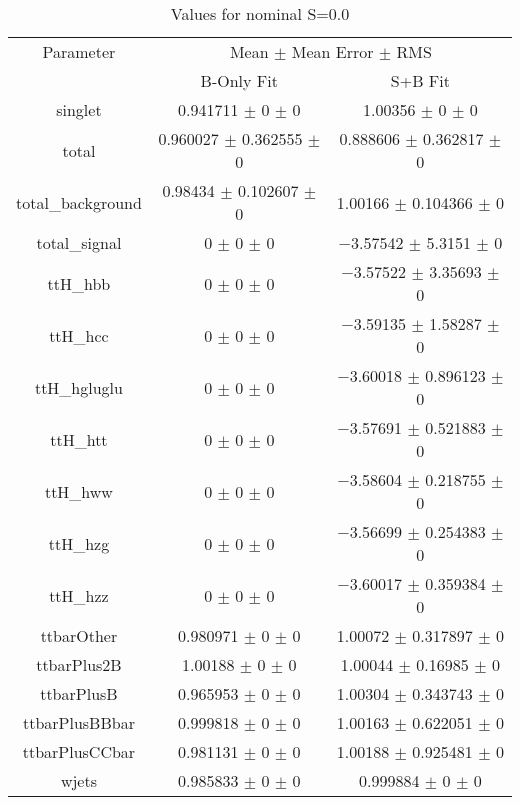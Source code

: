 \begin{table}
\centering
\caption{Values for nominal S=0.0}
\begin{tabular}{ccc}
\toprule
Parameter & \multicolumn{2}{c}{Mean $\pm$ Mean Error $\pm$ RMS}\\
 & B-Only Fit & S+B Fit\\
\midrule
singlet & \num{0.941711} $\pm$ \num{0} $\pm$ \num{0} & \num{1.00356} $\pm$ \num{0} $\pm$ \num{0}\\
total & \num{0.960027} $\pm$ \num{0.362555} $\pm$ \num{0} & \num{0.888606} $\pm$ \num{0.362817} $\pm$ \num{0}\\
total\_background & \num{0.98434} $\pm$ \num{0.102607} $\pm$ \num{0} & \num{1.00166} $\pm$ \num{0.104366} $\pm$ \num{0}\\
total\_signal & \num{0} $\pm$ \num{0} $\pm$ \num{0} & \num{-3.57542} $\pm$ \num{5.3151} $\pm$ \num{0}\\
ttH\_hbb & \num{0} $\pm$ \num{0} $\pm$ \num{0} & \num{-3.57522} $\pm$ \num{3.35693} $\pm$ \num{0}\\
ttH\_hcc & \num{0} $\pm$ \num{0} $\pm$ \num{0} & \num{-3.59135} $\pm$ \num{1.58287} $\pm$ \num{0}\\
ttH\_hgluglu & \num{0} $\pm$ \num{0} $\pm$ \num{0} & \num{-3.60018} $\pm$ \num{0.896123} $\pm$ \num{0}\\
ttH\_htt & \num{0} $\pm$ \num{0} $\pm$ \num{0} & \num{-3.57691} $\pm$ \num{0.521883} $\pm$ \num{0}\\
ttH\_hww & \num{0} $\pm$ \num{0} $\pm$ \num{0} & \num{-3.58604} $\pm$ \num{0.218755} $\pm$ \num{0}\\
ttH\_hzg & \num{0} $\pm$ \num{0} $\pm$ \num{0} & \num{-3.56699} $\pm$ \num{0.254383} $\pm$ \num{0}\\
ttH\_hzz & \num{0} $\pm$ \num{0} $\pm$ \num{0} & \num{-3.60017} $\pm$ \num{0.359384} $\pm$ \num{0}\\
ttbarOther & \num{0.980971} $\pm$ \num{0} $\pm$ \num{0} & \num{1.00072} $\pm$ \num{0.317897} $\pm$ \num{0}\\
ttbarPlus2B & \num{1.00188} $\pm$ \num{0} $\pm$ \num{0} & \num{1.00044} $\pm$ \num{0.16985} $\pm$ \num{0}\\
ttbarPlusB & \num{0.965953} $\pm$ \num{0} $\pm$ \num{0} & \num{1.00304} $\pm$ \num{0.343743} $\pm$ \num{0}\\
ttbarPlusBBbar & \num{0.999818} $\pm$ \num{0} $\pm$ \num{0} & \num{1.00163} $\pm$ \num{0.622051} $\pm$ \num{0}\\
ttbarPlusCCbar & \num{0.981131} $\pm$ \num{0} $\pm$ \num{0} & \num{1.00188} $\pm$ \num{0.925481} $\pm$ \num{0}\\
wjets & \num{0.985833} $\pm$ \num{0} $\pm$ \num{0} & \num{0.999884} $\pm$ \num{0} $\pm$ \num{0}\\
\bottomrule
\end{tabular}
\end{table}